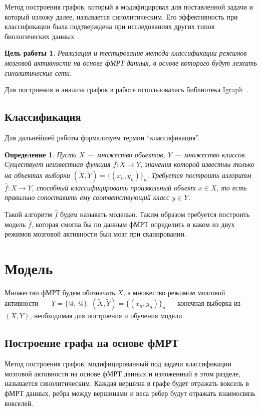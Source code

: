 \documentclass[specialist,
substylefile = spbu_report.rtx,
subf,href,colorlinks=true, 12pt]{disser}
\makeatletter
\newcommand*{\rom}[1]{\expandafter\@slowromancap\romannumeral #1@}
\newtheorem{defenition}{Определение}
\newtheorem*{purpose*}{Цель работы}
\makeatother
\begin{document}
			Метод построения графов, который я модифицировал для поставленной задачи и который изложу далее, называется синолитическим. Его эффективность при классификации была подтверждена при исследованиях других типов биологических данных~\cite{DemichevV2022, Krivonosov2020}.						
		
			\begin{purpose*}
				Реализация и тестирование метода классификации режимов мозговой активности на основе фМРТ данных, в основе которого будут лежать синолитические сети.
			\end{purpose*}
		
			Для построения и анализа графов в работе использовалась библиотека Igraph~\cite{Gabor2006}.
		
		\section{Классификация}
			Для дальнейшей работы формализуем термин “классификация”. 
			\begin{defenition}
				Пусть $X$ --- множество объектов, $Y$ --- множество классов. Существует неизвестная функция $f: X \rightarrow Y$, значения которой известны только на объектах выборки $(\widetilde{X}, \widetilde{Y}) =  \{(x_{n}, y_{n})\}_n$. Требуется построить алгоритм $\widehat{f}: X \rightarrow Y$, способный классифицировать произвольный объект $x \in X$, то есть правильно сопоставить ему соответствующий класс $y \in Y$.
			\end{defenition}
		
			Такой алгоритм $\widehat{f}$ будем называть моделью. Таким образом требуется построить модель $\widehat{f}$, которая смогла бы по данным фМРТ определить в каком из двух режимов мозговой активности был мозг при сканировании.
		
	\chapter{Модель}	
		Множество фМРТ будем обозначать $X$, а множество режимом мозговой активности~--- $Y = \{$\rom{1}, \rom{2}$\}$. $(\widetilde{X}, \widetilde{Y}) =  \{(x_{n}, y_{n})\}_n$ --- конечная выборка из $(X, Y)$, необходимая для построения и обучения модели.				
		
		\section{Построение графа на основе фМРТ}
			Метод построения графов, модифицированный под задачи классификации мозговой активности на основе фМРТ данных и изложенный в этом разделе, называется синолитическим. Каждая вершина в графе будет отражать воксель в фМРТ данных, ребра между вершинами и веса ребер будут отражать взаимосвязь вокселей. 			
			
\end{document}
